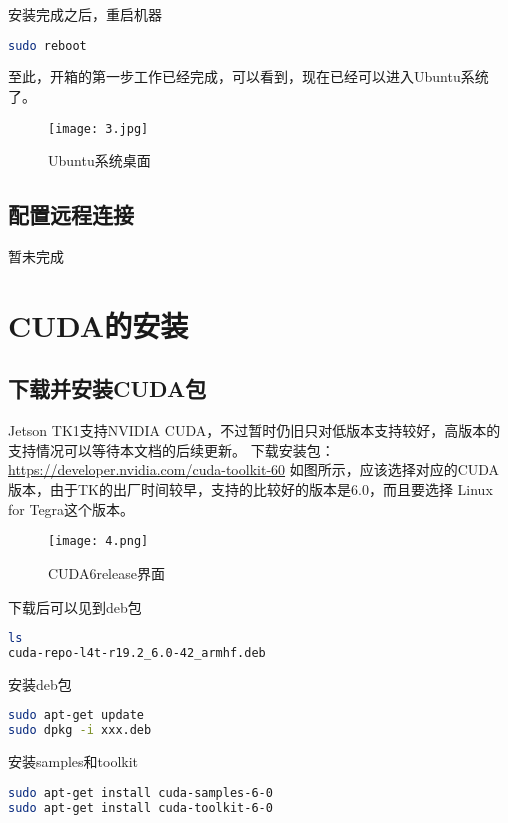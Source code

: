 \documentclass[openany]{ctexbook}
\newcommand{\warn}[1] {\fcolorbox{red!20}{red!20} {\color{red} #1}}
\begin{document}
安装完成之后，重启机器
{\setmainfont{Courier New Bold}                          %
\begin{lstlisting}[language=bash]
sudo reboot
\end{lstlisting}}

至此，开箱的第一步工作已经完成，可以看到，现在已经可以进入Ubuntu系统了。
\begin{figure}[h]
  \centering
  \texttt{[image: 3.jpg]}
  \caption{Ubuntu系统桌面}
\end{figure}

\section{配置远程连接}
暂未完成



\chapter{CUDA的安装}
\section{下载并安装CUDA包}
Jetson TK1支持NVIDIA CUDA，不过暂时仍旧只对低版本支持较好，高版本的支持情况可以等待本文档的后续更新。
下载安装包：\url{https://developer.nvidia.com/cuda-toolkit-60}
如图所示，应该选择对应的CUDA版本，由于TK的出厂时间较早，支持的比较好的版本是6.0，而且要选择\warn{Linux for Tegra}这个版本。
\begin{figure}[h]
  \centering
  \texttt{[image: 4.png]}
  \caption{CUDA6release界面}
\end{figure}

下载后可以见到deb包
{\setmainfont{Courier New Bold}                          %
\begin{lstlisting}[language=bash]
ls
cuda-repo-l4t-r19.2_6.0-42_armhf.deb
\end{lstlisting}}

安装deb包
{\setmainfont{Courier New Bold}                          %
\begin{lstlisting}[language=bash]
sudo apt-get update
sudo dpkg -i xxx.deb
\end{lstlisting}}

安装samples和toolkit
{\setmainfont{Courier New Bold}                          %
\begin{lstlisting}[language=bash]
sudo apt-get install cuda-samples-6-0
sudo apt-get install cuda-toolkit-6-0
\end{lstlisting}}
\end{document}
